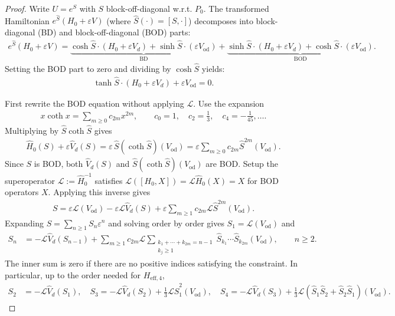 \begin{proof}
Write $U = e^S$ with $S$ block-off-diagonal w.r.t. $P_0$. The transformed Hamiltonian $e^{\hat{S}}(H_0 + \varepsilon V)$ (where $\hat{S}(\cdot) = [S, \cdot]$) decomposes into block-diagonal (BD) and block-off-diagonal (BOD) parts:
\begin{align}
e^{\hat{S}}(H_0 + \varepsilon V)
= \underbrace{\cosh \hat{S} \cdot (H_0 + \varepsilon V_d) + \sinh\hat{S} \cdot (\varepsilon V_{\mathrm{od}})}_{\text{BD}}
+ \underbrace{\sinh \hat{S} \cdot (H_0 + \varepsilon V_d) + \cosh \hat{S} \cdot (\varepsilon V_{\mathrm{od}})}_{\text{BOD}}.
\end{align}
Setting the BOD part to zero and dividing by $\cosh \hat{S}$ yields:
\begin{align}
\tanh \hat{S} \cdot (H_0 + \varepsilon V_d) + \varepsilon V_{\mathrm{od}} = 0.
\end{align}

First rewrite the BOD equation without applying $\mathcal L$.
Use the expansion
\begin{align}
x\coth x=\sum_{m\geq0}c_{2m}x^{2m},
\qquad
c_0=1,\quad c_2=\frac13,\quad c_4=-\frac1{45},\ldots .
\end{align}
Multiplying by $\hat S\coth \hat S$ gives
\begin{align}
    \hat H_0(S)+\varepsilon \hat V_d(S)
    =\varepsilon\,\hat{S}(\coth\hat{S})(V_{\mathrm{od}})
    =\varepsilon\sum_{m\geq0}c_{2m}\hat S^{2m}(V_{\mathrm{od}}). \label{eq:tid_od_eq}
\end{align}
Since $S$ is BOD, both $\hat{V}_{d}(S)$ and $\hat{S}(\coth\hat{S})(V_{\mathrm{od}})$ are BOD.
Setup the superoperator $\mathcal{L}:= \hat H_0^{-1}$ satisfies $ \mathcal L([H_0, X])=\mathcal L\hat H_0(X)=X$ for BOD operators $X$.
Applying this inverse gives
\begin{align}
    S
    =\varepsilon\mathcal L(V_{\mathrm{od}})
    -\varepsilon\mathcal L\hat V_d(S)
    +\varepsilon\sum_{m\geq1}c_{2m}
    \mathcal L\hat S^{2m}(V_{\mathrm{od}}).
\end{align}
Expanding $S = \sum_{n \geq 1} S_n \varepsilon^n$ and solving order by order gives $S_1=\mathcal L(V_{\mathrm{od}})$ and 
\begin{align}
S_n&=-\mathcal L\hat V_d(S_{n-1})
+\sum_{m\geq1}c_{2m}\mathcal L
\sum_{\substack{k_1+\cdots+k_{2m}=n-1\\ k_j\geq1}}
\hat S_{k_1}\cdots \hat S_{k_{2m}}(V_{\mathrm{od}}),
\qquad n\geq2.
\end{align}
The inner sum is zero if there are no positive indices satisfying the constraint.
In particular, up to the order needed for $H_{\mathrm{eff},4}$,
\begin{align}
S_2&=-\mathcal L\hat V_d(S_1), \quad
S_3=-\mathcal L\hat V_d(S_2) +\frac13\mathcal L\hat S_1^2(V_{\mathrm{od}}), \quad 
S_4=-\mathcal L\hat V_d(S_3) +\frac13\mathcal L\left(\hat S_1\hat S_2+\hat S_2\hat S_1\right)(V_{\mathrm{od}}).
\end{align}


\end{proof}
